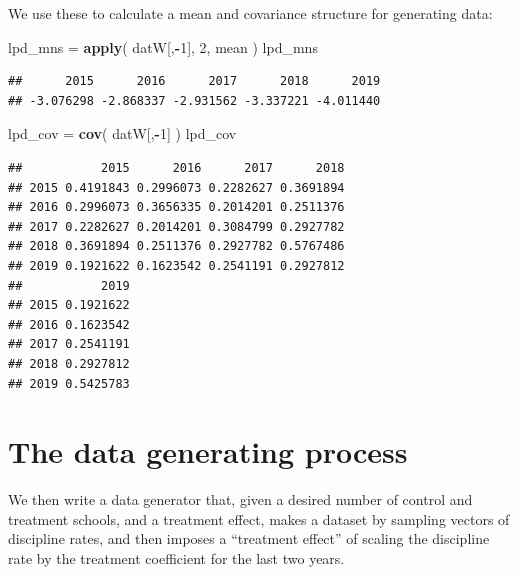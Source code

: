 \documentclass[
]{book}
\newenvironment{Shaded}{\begin{snugshade}}{\end{snugshade}}
\newcommand{\DecValTok}[1]{\textcolor[rgb]{0.00,0.00,0.81}{#1}}
\newcommand{\FunctionTok}[1]{\textcolor[rgb]{0.13,0.29,0.53}{\textbf{#1}}}
\newcommand{\NormalTok}[1]{#1}
\newcommand{\OtherTok}[1]{\textcolor[rgb]{0.56,0.35,0.01}{#1}}
\newcommand{\SpecialCharTok}[1]{\textcolor[rgb]{0.81,0.36,0.00}{\textbf{#1}}}
\begin{document}
We use these to calculate a mean and covariance structure for generating data:

\begin{Shaded}
\begin{Highlighting}[]
\NormalTok{lpd\_mns }\OtherTok{=} \FunctionTok{apply}\NormalTok{( datW[,}\SpecialCharTok{{-}}\DecValTok{1}\NormalTok{], }\DecValTok{2}\NormalTok{, mean )}
\NormalTok{lpd\_mns}
\end{Highlighting}
\end{Shaded}

\begin{verbatim}
##      2015      2016      2017      2018      2019 
## -3.076298 -2.868337 -2.931562 -3.337221 -4.011440
\end{verbatim}

\begin{Shaded}
\begin{Highlighting}[]
\NormalTok{lpd\_cov }\OtherTok{=} \FunctionTok{cov}\NormalTok{( datW[,}\SpecialCharTok{{-}}\DecValTok{1}\NormalTok{] )}
\NormalTok{lpd\_cov}
\end{Highlighting}
\end{Shaded}

\begin{verbatim}
##           2015      2016      2017      2018
## 2015 0.4191843 0.2996073 0.2282627 0.3691894
## 2016 0.2996073 0.3656335 0.2014201 0.2511376
## 2017 0.2282627 0.2014201 0.3084799 0.2927782
## 2018 0.3691894 0.2511376 0.2927782 0.5767486
## 2019 0.1921622 0.1623542 0.2541191 0.2927812
##           2019
## 2015 0.1921622
## 2016 0.1623542
## 2017 0.2541191
## 2018 0.2927812
## 2019 0.5425783
\end{verbatim}

\section{The data generating process}\label{the-data-generating-process-2}

We then write a data generator that, given a desired number of control and treatment schools, and a treatment effect, makes a dataset by sampling vectors of discipline rates, and then imposes a ``treatment effect'' of scaling the discipline rate by the treatment coefficient for the last two years.
\end{document}
